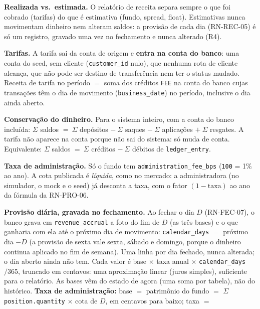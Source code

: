 \documentclass[11pt,a4paper]{article}
\newcommand{\obr}{\textbf{[OBR]}}          %
\newcommand{\dec}{\textbf{[DEC]}}          %
\newcommand{\tb}[1]{\texttt{#1}}           %
\begin{document}
\begin{regras}
  \item[RN-REC-01 \dec] \textbf{Realizada vs.\ estimada.} O relatório de receita separa sempre o que
  foi cobrado (tarifas) do que é estimativa (fundo, spread, float). Estimativas nunca movimentam
  dinheiro nem alteram saldos: a provisão de cada dia (RN-REC-05) é só um registro, gravado uma vez
  no fechamento e nunca alterado (R4).
  \item[RN-REC-02 \dec] \textbf{Tarifas.} A tarifa sai da conta de origem e \textbf{entra na conta do
  banco}: uma conta do seed, sem cliente (\tb{customer_id} nulo), que nenhuma rota de cliente
  alcança, que não pode ser destino de transferência nem ter o status mudado. Receita de tarifa no
  período $=$ soma dos créditos \tb{FEE} na conta do banco cujas transações têm o dia de movimento
  (\tb{business_date}) no período, inclusive o dia ainda aberto.
  \item[RN-REC-03 \obr] \textbf{Conservação do dinheiro.} Para o sistema inteiro, com a conta do
  banco incluída: $\Sigma$ saldos $=\ \Sigma$ depósitos $-\ \Sigma$ saques $-\ \Sigma$ aplicações
  $+\ \Sigma$ resgates. A tarifa não aparece na conta porque não sai do sistema: só muda de conta.
  Equivalente: $\Sigma$ saldos $=\ \Sigma$ créditos $-\ \Sigma$ débitos de \tb{ledger_entry}.
  \item[RN-REC-04 \dec] \textbf{Taxa de administração.} Só o fundo tem \tb{administration_fee_bps}
  (\tb{100} = 1\% ao ano). A cota publicada é \emph{líquida}, como no mercado: a administradora
  (no simulador, o mock e o seed) já desconta a taxa, com o fator $(1 - \text{taxa})$ ao ano da
  fórmula da RN-PRO-06.
  \item[RN-REC-05 \dec] \textbf{Provisão diária, gravada no fechamento.} Ao fechar o dia $D$
  (RN-FEC-07), o banco grava em \tb{revenue_accrual} a foto do fim de $D$ (as três bases) e o que
  ganharia com ela até o próximo dia de movimento: \tb{calendar_days} $=$ próximo dia $- D$ (a provisão
  de sexta vale sexta, sábado e domingo, porque o dinheiro continua aplicado no fim de semana). Uma
  linha por dia fechado, nunca alterada; o dia aberto ainda não tem. Cada valor é base $\times$ taxa
  anual $\times$ \tb{calendar_days} $/ 365$, truncado em centavos: uma aproximação linear (juros
  simples), suficiente para o relatório. As bases vêm do estado de agora (uma soma por tabela), não
  do histórico. \textbf{Taxa de administração:} base $=$ patrimônio do fundo $=$ $\Sigma$
  \tb{position.quantity} $\times$ cota de $D$, em centavos para baixo; taxa $=$

\end{regras}
\end{document}
